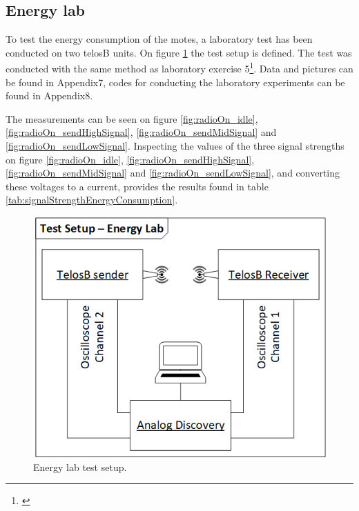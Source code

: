 \subsection{Energy lab}\label{sc:energylab}

To test the energy consumption of the motes, a laboratory test has been conducted on two telosB units. On figure \ref{fig:energyLab_testSetup} the test setup is defined. The test was conducted with the same method as laboratory exercise 5\footnote{\cite{Madsen}}. Data and pictures can be found in Appendix7, codes for conducting the laboratory experiments can be found in Appendix8.

\noindent The measurements can be seen on figure \ref{fig:radioOn_idle}, \ref{fig:radioOn_sendHighSignal}, \ref{fig:radioOn_sendMidSignal} and \ref{fig:radioOn_sendLowSignal}. Inspecting the values of the three signal strengths on figure \ref{fig:radioOn_idle}, \ref{fig:radioOn_sendHighSignal}, \ref{fig:radioOn_sendMidSignal} and \ref{fig:radioOn_sendLowSignal}, and converting these voltages to a current, provides the results found in table \ref{tab:signalStrengthEnergyConsumption}.

\begin{figure}[H]
	\centering
	\includegraphics[width=1\linewidth]{implementation/energylab/fig/energyLab_testSetup.png}
	\caption{Energy lab test setup.}
	\label{fig:energyLab_testSetup}
\end{figure}

